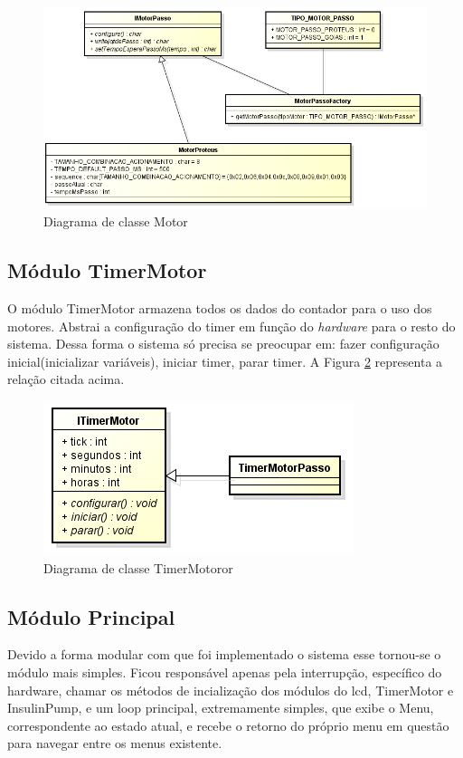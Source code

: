 \begin{figure}[htp]
	\centering
	\includegraphics[scale=0.8]{images/classe_motor.png}
	\caption{Diagrama de classe Motor}	
	\label{fig:classemotor}
\end{figure}

\subsection{Módulo TimerMotor}

O módulo TimerMotor armazena todos os dados do contador para o uso dos motores. Abstrai a configuração do timer em função do \emph{hardware} para o resto do sistema. Dessa forma o sistema só precisa se preocupar em: fazer configuração inicial(inicializar variáveis), iniciar timer, parar timer. A Figura \ref{fig:classe_timer_motor} representa a relação citada acima.

\begin{figure}[htp]
	\centering
	\includegraphics[scale=1]{images/classe_timer_motor.png}
	\caption{Diagrama de classe TimerMotoror}	
	\label{fig:classe_timer_motor}
\end{figure}


\subsection{Módulo Principal}

Devido a forma modular com  que foi implementado o sistema esse tornou-se o módulo mais simples. Ficou responsável apenas pela interrupção, específico do hardware, chamar os métodos de incialização dos módulos do lcd, TimerMotor e InsulinPump, e um loop principal, extremamente simples, que exibe o Menu, correspondente ao estado atual, e recebe o retorno do próprio menu em questão para navegar entre os menus existente.